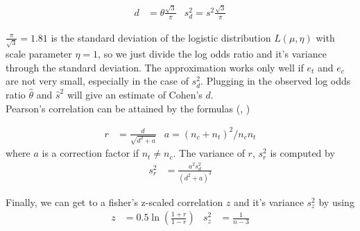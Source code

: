 \documentclass[11pt,a4paper,twoside]{book}\usepackage[]{graphicx}\usepackage[]{color}
\begin{document}
\begin{align}
d &= \theta \frac{\sqrt{3}}{\pi} & s_d^2 = s^2 \frac{\sqrt{3}}{\pi} \nonumber
\end{align}

$\frac{\pi}{\sqrt{3}} = 1.81$ is the standard deviation of the logistic distribution $L(\mu, \eta)$ with scale parameter $\eta = 1$, so we just divide the log odds ratio and it's variance through the standard deviation. The approximation works only well if $e_t$ and $e_c$ are not very small, especially in the case of $s_d^2$. Plugging in the observed log odds ratio $\hat{\theta}$ and $\hat{s}^2$ will give an estimate of Cohen's $d$.\\
Pearson's correlation can be attained by the formulas (\citet{olkin1985dtor}, \cite[48]{Intro.meta})

\begin{align}
r &= \frac{d}{\sqrt{d^2 + a}} & a = (n_c + n_t)^2 / n_c n_t \nonumber
\end{align}
where $a$ is a correction factor if $n_t \neq n_c$. The variance of $r$, $s_r^2$ is computed by
\begin{align}
s_r^2 &= \frac{a^2 s_d^2}{(d^2 + a)^3} \nonumber
\end{align}

Finally, we can get to a fisher's z-scaled correlation $z$ and it's variance $s_z^2$ by using
\begin{align}
z &= 0.5 \ln(\frac{1 + r}{1 - r}) & \nonumber
s_z^2 &= \frac{1}{n-3}
\end{align}















\end{document}
